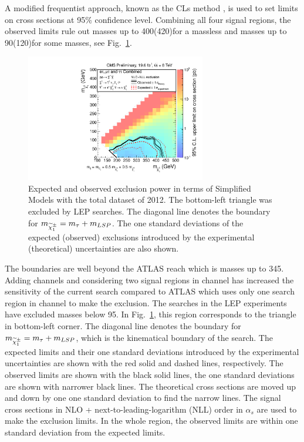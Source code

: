 A modified frequentist approach, known as the CLs method \cite{read:CLs}, is used to 
set limits on cross sections at 95\% confidence level.
Combining all four signal regions,
the observed limits rule out \chione  masses up to 400(420)\GeV  for a massless \PSGczDo and  
\PSGczDo masses up to 90(120)\GeV for some  \chione masses,
see Fig.~\ref{fig:limit_final}. 
\begin{linenomath}
\begin{figure}[!htb]
\centering
\includegraphics[width=0.7\textwidth,keepaspectratio=true]{StatisticsFig/Exclusion4Bins.pdf}
\caption{Expected and observed exclusion power in terms of Simplified Models
with the total dataset of 2012. The bottom-left triangle was excluded by LEP \sTau searches. 
The diagonal line denotes the boundary for $m_{\widetilde{\chi}^{\pm}_1} = m_{\tau} + m_{LSP}$.
The one standard deviations of the expected (observed) exclusions introduced by the experimental 
(theoretical) uncertainties are also shown.}
\label{fig:limit_final}
\end{figure}
\end{linenomath}
The boundaries are well beyond the ATLAS reach which is \chione  masses up to 345\GeV \cite{Aad:2014yka}. Adding \leptonTau channels
and considering two signal regions in \tauTau channel has increased the sensitivity of the current search compared to ATLAS which uses only 
one search region in \tauTau channel to make the exclusion.
The \sTau searches in the LEP experiments \cite{lepsusy} have excluded masses below 95\GeV. In Fig.~\ref{fig:limit_final}, 
this region corresponds to the triangle in bottom-left corner. %
The diagonal line denotes the boundary for $m_{\widetilde{\chi}^{\pm}_1} = m_{\tau} + m_{LSP}$, which is the kinematical boundary of the search.
The expected limits and their one standard deviations introduced by the experimental 
uncertainties are shown with the red solid and dashed lines, respectively. The observed limits are shown with the black solid lines, the one 
standard deviations are shown with narrower black lines. The theoretical cross sections are moved up and down by one one standard deviation to 
find the narrow lines.
The signal cross sections in NLO + next-to-leading-logarithm (NLL) order in $\alpha_s$ are used to make the exclusion limits.
In the whole region, the observed limits are within one standard deviation from the expected limits.  

